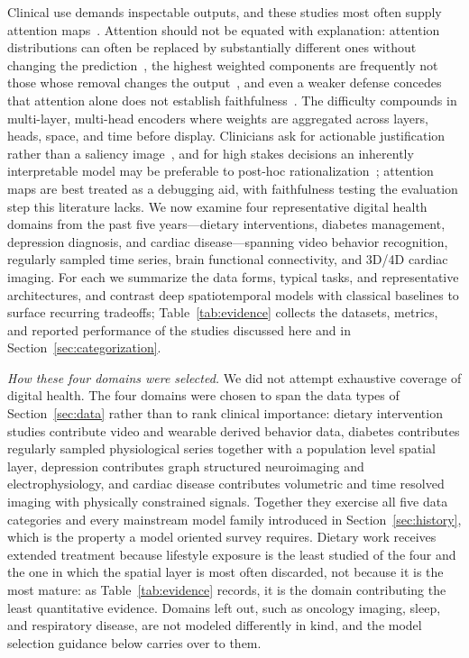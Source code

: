 \documentclass[journal]{IEEEtran}
\begin{document}
Clinical use demands inspectable outputs, and these studies most often supply attention maps~\cite{2,4}. Attention should not be equated with explanation: attention distributions can often be replaced by substantially different ones without changing the prediction~\cite{jain2019attention}, the highest weighted components are frequently not those whose removal changes the output~\cite{serrano2019attention}, and even a weaker defense concedes that attention alone does not establish faithfulness~\cite{wiegreffe2019attention}. The difficulty compounds in multi-layer, multi-head encoders where weights are aggregated across layers, heads, space, and time before display. Clinicians ask for actionable justification rather than a saliency image~\cite{tonekaboni2019clinicians}, and for high stakes decisions an inherently interpretable model may be preferable to post-hoc rationalization~\cite{rudin2019stopexplaining}; attention maps are best treated as a debugging aid, with faithfulness testing the evaluation step this literature lacks.
\else
We now examine four representative digital health domains from the past five years---dietary interventions, diabetes management, depression diagnosis, and cardiac disease---spanning video behavior recognition, regularly sampled time series, brain functional connectivity, and 3D/4D cardiac imaging. For each we summarize the data forms, typical tasks, and representative architectures, and contrast deep spatiotemporal models with classical baselines to surface recurring tradeoffs; Table~\ref{tab:evidence} collects the datasets, metrics, and reported performance of the studies discussed here and in Section~\ref{sec:categorization}.

\emph{How these four domains were selected.} We did not attempt exhaustive coverage of digital health. The four domains were chosen to span the data types of Section~\ref{sec:data} rather than to rank clinical importance: dietary intervention studies contribute video and wearable derived behavior data, diabetes contributes regularly sampled physiological series together with a population level spatial layer, depression contributes graph structured neuroimaging and electrophysiology, and cardiac disease contributes volumetric and time resolved imaging with physically constrained signals. Together they exercise all five data categories and every mainstream model family introduced in Section~\ref{sec:history}, which is the property a model oriented survey requires. Dietary work receives extended treatment because lifestyle exposure is the least studied of the four and the one in which the spatial layer is most often discarded, not because it is the most mature: as Table~\ref{tab:evidence} records, it is the domain contributing the least quantitative evidence. Domains left out, such as oncology imaging, sleep, and respiratory disease, are not modeled differently in kind, and the model selection guidance below carries over to them.
\end{document}
